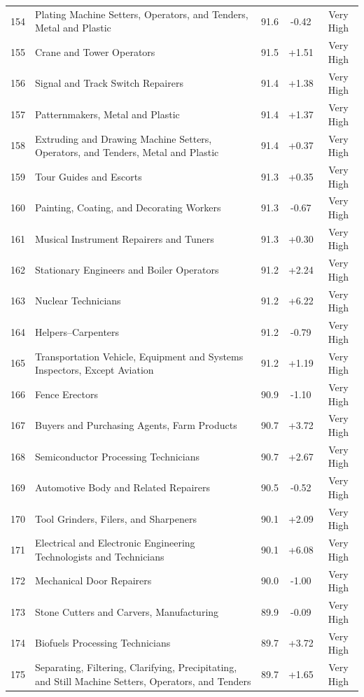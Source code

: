 {\begin{longtable}{rp{7cm}ccc}
154 & Plating Machine Setters, Operators, and Tenders, Metal and Plastic & 91.6 & -0.42 & Very High \\
155 & Crane and Tower Operators & 91.5 & +1.51 & Very High \\
156 & Signal and Track Switch Repairers & 91.4 & +1.38 & Very High \\
157 & Patternmakers, Metal and Plastic & 91.4 & +1.37 & Very High \\
158 & Extruding and Drawing Machine Setters, Operators, and Tenders, Metal and Plastic & 91.4 & +0.37 & Very High \\
159 & Tour Guides and Escorts & 91.3 & +0.35 & Very High \\
160 & Painting, Coating, and Decorating Workers & 91.3 & -0.67 & Very High \\
161 & Musical Instrument Repairers and Tuners & 91.3 & +0.30 & Very High \\
162 & Stationary Engineers and Boiler Operators & 91.2 & +2.24 & Very High \\
163 & Nuclear Technicians & 91.2 & +6.22 & Very High \\
164 & Helpers--Carpenters & 91.2 & -0.79 & Very High \\
165 & Transportation Vehicle, Equipment and Systems Inspectors, Except Aviation & 91.2 & +1.19 & Very High \\
166 & Fence Erectors & 90.9 & -1.10 & Very High \\
167 & Buyers and Purchasing Agents, Farm Products & 90.7 & +3.72 & Very High \\
168 & Semiconductor Processing Technicians & 90.7 & +2.67 & Very High \\
169 & Automotive Body and Related Repairers & 90.5 & -0.52 & Very High \\
170 & Tool Grinders, Filers, and Sharpeners & 90.1 & +2.09 & Very High \\
171 & Electrical and Electronic Engineering Technologists and Technicians & 90.1 & +6.08 & Very High \\
172 & Mechanical Door Repairers & 90.0 & -1.00 & Very High \\
173 & Stone Cutters and Carvers, Manufacturing & 89.9 & -0.09 & Very High \\
174 & Biofuels Processing Technicians & 89.7 & +3.72 & Very High \\
175 & Separating, Filtering, Clarifying, Precipitating, and Still Machine Setters, Operators, and Tenders & 89.7 & +1.65 & Very High \\

\end{longtable}}
